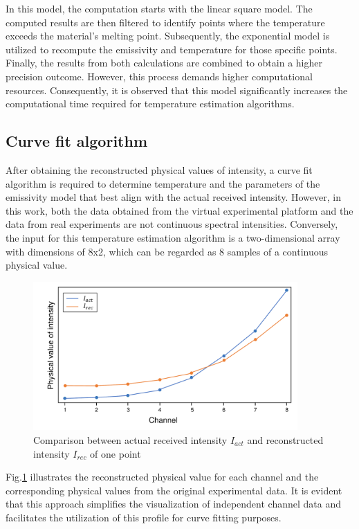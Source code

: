 In this model, the computation starts with the linear square model. The computed 
results are then filtered to identify points where the temperature exceeds 
the material's melting point. Subsequently, the exponential model is 
utilized to recompute the emissivity and temperature for those specific points. 
Finally, the results from both calculations are combined to obtain a higher 
precision outcome. However, this process demands higher computational resources. 
Consequently, it is observed that this model significantly increases the 
computational time required for temperature estimation algorithms.


\subsection{Curve fit algorithm}
After obtaining the reconstructed physical values of intensity, 
a curve fit algorithm is required to determine  
temperature and the parameters of the emissivity model that best 
align with the actual received intensity. However, in this work, both 
the data obtained from the virtual experimental platform and the data 
from real experiments are not continuous spectral intensities. 
Conversely, the input for this temperature estimation algorithm is a 
two-dimensional array with dimensions of 8x2, which can be regarded as 8 
samples of a continuous physical value.


\begin{figure}[htbp]
  \centering
  \includegraphics[width=0.9\textwidth]{figures/curve_fit.pdf}
  \caption{Comparison between actual received intensity $I_{act}$ 
  and reconstructed intensity $I_{rec}$ of one point}
  \label{fig: curve_fit_demo}
\end{figure}


Fig.\ref{fig: curve_fit_demo} illustrates the reconstructed physical 
value for each channel and the corresponding physical values from the 
original experimental data. It is evident that this approach simplifies 
the visualization of independent channel data and facilitates the 
utilization of this profile for curve fitting purposes.


